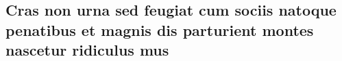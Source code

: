 \documentclass[
article,			%
11pt,				%
twoside,			%
a4paper,			%
section=TITLE,		%
onecolumn,          %
english,			%
brazil,				%
sumario=tradicional
]{abntex2}
\begin{document}
    \vspace{1cm}
    \begin{anexosenv}
        
        \chapter{Cras non urna sed feugiat cum sociis natoque penatibus et magnis dis
            parturient montes nascetur ridiculus mus}
        
        \lipsum[31]
        
    \end{anexosenv}
\end{document}
